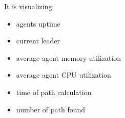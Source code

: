 It is visualizing:
\begin{itemize}
    \item agents uptime
    \item current leader
    \item average agent memory utilization
    \item average agent CPU utilization
    \item time of path calculation
    \item number of path found
\end{itemize}

